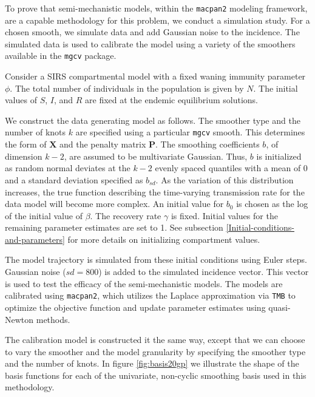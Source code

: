 \documentclass[
11pt, %
oneside, %
english, %
singlespacing, %
]{macthesis} %
\begin{document}
To prove that semi-mechanistic models, within the \texttt{macpan2} modeling framework, are a capable methodology for this problem, we conduct a simulation study. For a chosen smooth, we simulate data and add Gaussian noise to the incidence. The simulated data is used to calibrate the model using a variety of the smoothers available in the \texttt{mgcv} package.

Consider a SIRS compartmental model with a fixed waning immunity parameter \(\phi\). The total number of individuals in the population is given by \(N\). The initial values of \(S\), \(I\), and \(R\) are fixed at the endemic equilibrium solutions.

We construct the data generating model as follows. The smoother type and the number of knots \(k\) are specified using a particular \texttt{mgcv} smooth. This determines the form of \(\mathbf{X}\) and the penalty matrix \(\mathbf{P}\). The smoothing coefficients \(b\), of dimension \(k-2\), are assumed to be multivariate Gaussian. Thus, \(b\) is initialized as random normal deviates at the \(k-2\) evenly spaced quantiles with a mean of 0 and a standard deviation specified as \(b_{sd}\). As the variation of this distribution increases, the true function describing the time-varying transmission rate for the data model will become more complex. An initial value for \(b_0\) is chosen as the log of the initial value of \(\beta\). The recovery rate \(\gamma\) is fixed. Initial values for the remaining parameter estimates are set to 1. See subsection \ref{Initial-conditions-and-parameters} for more details on initializing compartment values.

The model trajectory is simulated from these initial conditions using Euler steps. Gaussian noise (\(sd = 800\)) is added to the simulated incidence vector. This vector is used to test the efficacy of the semi-mechanistic models. The models are calibrated using \texttt{macpan2}, which utilizes the Laplace approximation via \texttt{TMB} to optimize the objective function and update parameter estimates using quasi-Newton methods.

The calibration model is constructed it the same way, except that we can choose to vary the smoother and the model granularity by specifying the smoother type and the number of knots. In figure \ref{fig:basis20gp} we illustrate the shape of the basis functions for each of the univariate, non-cyclic smoothing basis used in this methodology.
\end{document}
